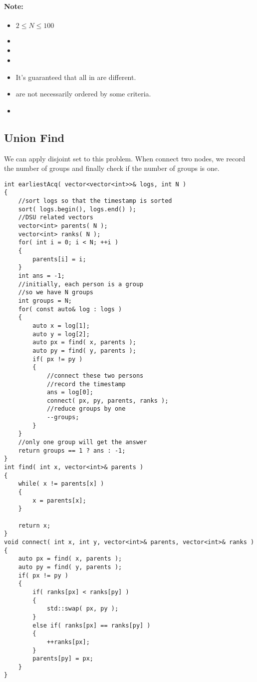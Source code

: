 \paragraph{Note:}

\begin{itemize}
\item $2 \leq N \leq 100$
\item {}
\item {}
\item {}
\item It's guaranteed that all  in  are different.
\item {} are not necessarily ordered by some criteria.
\item {}
\end{itemize}

\subsection{Union Find}
We can apply disjoint set to this problem. When connect two nodes, we record the number of groups and finally check if the number of groups is one.

\setcounter{lstlisting}{0}
\begin{lstlisting}[style=customc, caption={DSU}]
int earliestAcq( vector<vector<int>>& logs, int N )
{
    //sort logs so that the timestamp is sorted
    sort( logs.begin(), logs.end() );
    //DSU related vectors
    vector<int> parents( N );
    vector<int> ranks( N );
    for( int i = 0; i < N; ++i )
    {
        parents[i] = i;
    }
    int ans = -1;
    //initially, each person is a group
    //so we have N groups
    int groups = N;
    for( const auto& log : logs )
    {
        auto x = log[1];
        auto y = log[2];
        auto px = find( x, parents );
        auto py = find( y, parents );
        if( px != py )
        {
            //connect these two persons
            //record the timestamp
            ans = log[0];
            connect( px, py, parents, ranks );
            //reduce groups by one
            --groups;
        }
    }
    //only one group will get the answer
    return groups == 1 ? ans : -1;
}
int find( int x, vector<int>& parents )
{
    while( x != parents[x] )
    {
        x = parents[x];
    }

    return x;
}
void connect( int x, int y, vector<int>& parents, vector<int>& ranks )
{
    auto px = find( x, parents );
    auto py = find( y, parents );
    if( px != py )
    {
        if( ranks[px] < ranks[py] )
        {
            std::swap( px, py );
        }
        else if( ranks[px] == ranks[py] )
        {
            ++ranks[px];
        }
        parents[py] = px;
    }
}
\end{lstlisting}